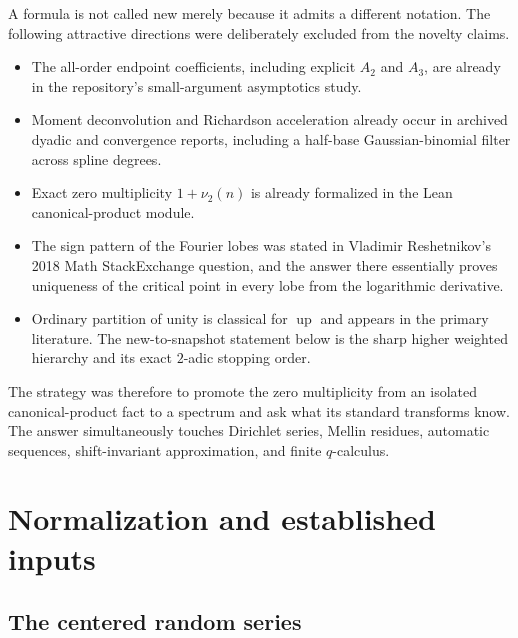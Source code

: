\documentclass[11pt]{article}
\numberwithin{equation}{section}
\theoremstyle{definition}
\theoremstyle{remark}
\newcommand{\Up}{\operatorname{up}}
\begin{document}
A formula is not called new merely because it admits a different notation.  The
following attractive directions were deliberately excluded from the novelty
claims.
\begin{itemize}
\item The all-order endpoint coefficients, including explicit $A_2$ and $A_3$,
      are already in the repository's small-argument asymptotics study.
\item Moment deconvolution and Richardson acceleration already occur in archived
      dyadic and convergence reports, including a half-base Gaussian-binomial
      filter across spline degrees.
\item Exact zero multiplicity $1+\nu_2(n)$ is already formalized in the Lean
      canonical-product module.
\item The sign pattern of the Fourier lobes was stated in Vladimir Reshetnikov's
      2018 Math StackExchange question, and the answer there essentially proves
      uniqueness of the critical point in every lobe from the logarithmic
      derivative.
\item Ordinary partition of unity is classical for $\Up$ and appears in the
      primary literature.  The new-to-snapshot statement below is the sharp
      higher weighted hierarchy and its exact $2$-adic stopping order.
\end{itemize}

The strategy was therefore to promote the zero multiplicity from an isolated
canonical-product fact to a spectrum and ask what its standard transforms know.
The answer simultaneously touches Dirichlet series, Mellin residues, automatic
sequences, shift-invariant approximation, and finite $q$-calculus.

\section{Normalization and established inputs}
\label{p2:sec:normalization}

\subsection{The centered random series}
\end{document}
